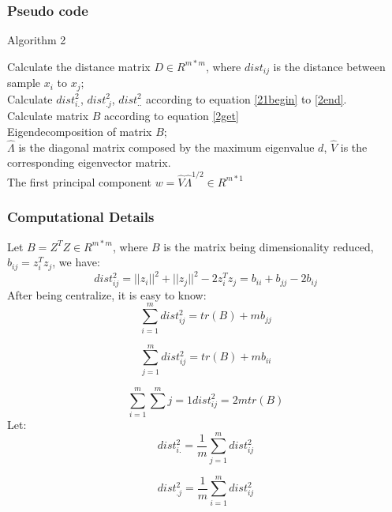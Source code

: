 \documentclass{article}
\theoremstyle{definition}
\numberwithin{equation}{section}
\numberwithin{figure}{section}
\begin{document}
\subsubsection{Pseudo code}
\begin{algorithm}[H]
\BlankLine
{}
\caption{Algorithm 2}\label{Algorithm 2}
\BlankLine
Calculate the distance matrix $D\in R^{m*m}$, where $dist_{ij}$ is the distance between sample $x_i$ to $x_j$;\\
Calculate $dist_{i.}^2$, $dist_{.j}^2$, $dist^2_{..}$ according to equation \ref{21begin} to \ref{2end}.\\
Calculate matrix $B$ according to equation \ref{2get}\\
Eigendecomposition of matrix $B$;\\
$\hat{\Lambda} $ is the diagonal matrix composed by the maximum eigenvalue $d$, $\hat{V}$ is the corresponding eigenvector matrix.\\
The first principal component $w=\hat{V}\hat{\Lambda}^{1/2}\in R^{m*1}$

\end{algorithm}
\subsubsection{Computational Details}
Let $B=Z^TZ\in R^{m*m}$, where $B$ is the matrix being dimensionality reduced, $b_{ij}=z_i^Tz_j$, we have:
\begin{equation}
\label{2beign}
dist_{ij}^2=||z_i||^2+||z_j||^2-2z_i^Tz_j
=b_{ii}+b_{jj}-2b_{ij} 
\end{equation}
After being centralize, it is easy to know:
\begin{equation}
\sum^m_{i=1}dist_{ij}^2=tr(B)+mb_{jj}
\end{equation}

\begin{equation}
\sum^m_{j=1}dist_{ij}^2=tr(B)+mb_{ii}
\end{equation}

\begin{equation}
\sum^m_{i=1}\sum^m{j=1}dist_{ij}^2=2mtr(B)
\end{equation}
Let:
\begin{equation}
\label{21begin}
dist_{i.}^2=\frac{1}{m}\sum^m_{j=1}dist^2_{ij}
\end{equation}

\begin{equation}
dist_{.j}^2=\frac{1}{m}\sum^m_{i=1}dist^2_{ij}
\end{equation}
\end{document}
